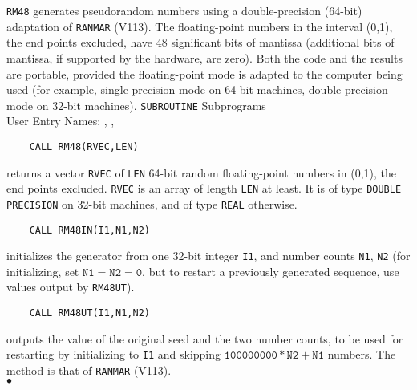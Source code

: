                          
             
\Submitter{}          
{\tt RM48} generates pseudorandom numbers using a double-precision
(64-bit) adaptation of {\tt RANMAR} (V113).  The floating-point numbers
in the interval (0,1), the end points excluded,
have 48 significant bits of mantissa (additional bits of
mantissa, if supported by the hardware, are zero).  Both the
code and the results are portable, provided the floating-point mode
is adapted to the computer being used (for example, single-precision
mode on 64-bit machines, double-precision mode on 32-bit machines).
\Structure
{\tt SUBROUTINE} Subprograms\\
User Entry Names: , , 
\Usage
\begin{verbatim}
    CALL RM48(RVEC,LEN)
\end{verbatim}
returns a vector {\tt RVEC} of {\tt LEN}
64-bit random floating-point numbers in (0,1), the end points excluded.
{\tt RVEC} is an array of length {\tt LEN} at least. It is of type
{\tt DOUBLE PRECISION} on 32-bit machines, and of type {\tt REAL}
otherwise.
\begin{verbatim}
    CALL RM48IN(I1,N1,N2)
\end{verbatim}
initializes the generator from one
32-bit integer {\tt I1}, and number counts {\tt N1}, {\tt N2}
(for initializing, set $\mathtt{N1=N2=0}$, but to restart
a previously generated sequence, use values output by {\tt RM48UT}).
\begin{verbatim}
    CALL RM48UT(I1,N1,N2)
\end{verbatim}
outputs the value of the original seed and the two number counts,
to be used for restarting by initializing to {\tt I1} and
skipping $\mathtt{100000000*N2+N1}$ numbers.
\Method
The method is that of {\tt RANMAR} (V113). \\
$\bullet$
